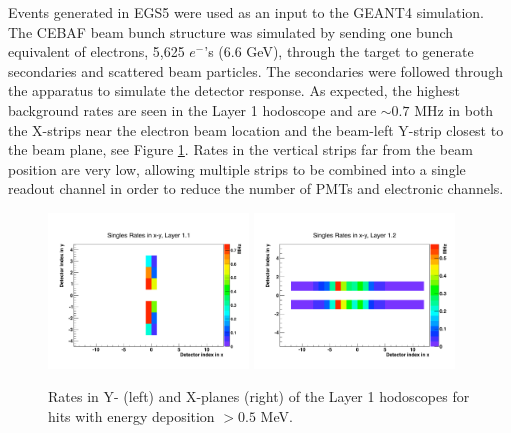 Events generated in EGS5 were used as an input to the GEANT4 simulation. The CEBAF beam bunch structure was simulated by sending 
one bunch equivalent of electrons, 5,625 $e^-$'s (6.6 GeV), through 
the target to generate secondaries and scattered beam particles. The secondaries were followed through the apparatus
to simulate the detector response. As expected, the 
highest background rates are seen in the Layer 1 hodoscope and are $\sim 0.7$ MHz in both the X-strips near the electron beam location and 
the beam-left Y-strip closest to the beam plane, see Figure \ref{fig:l1rates}. Rates in the vertical strips far from the 
beam position are very low, allowing multiple strips to be combined into a single readout channel in order to reduce the number 
of PMTs and electronic channels.  

\begin{figure}[htbp]
\begin{center}
\includegraphics[width=0.475\textwidth]{performance/trigger/muon_singles1}
\includegraphics[width=0.475\textwidth]{performance/trigger/muon_singles2}
\caption{Rates in Y- (left) and X-planes (right) of the Layer 1 hodoscopes for hits with energy deposition $> 0.5$ MeV.}
\label{fig:l1rates}
\end{center}
\end{figure}

